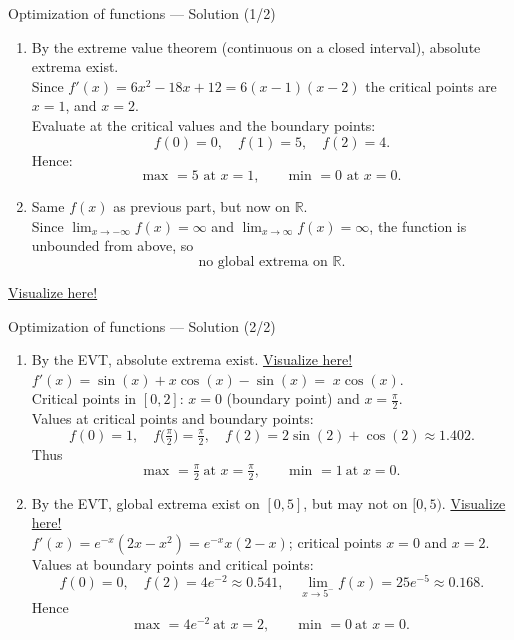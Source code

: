 \documentclass[9pt]{beamer}
\begin{document}
\begin{frame}{Optimization of functions — Solution (1/2)}
\begin{enumerate}[leftmargin=0.5cm, label=(\alph*), rightmargin=0.2cm]

\item By the extreme value theorem (continuous on a closed interval), absolute extrema exist. \\
Since $f'(x)=6x^2-18x+12=6(x-1)(x-2)$ the critical points are $x=1$, and $x=2$. \\
Evaluate at the critical values and the boundary points:
\[
f(0)=0,\quad f(1)=5,\quad f(2)=4.
\]
Hence:
\[
\boxed{\text{max }=5 \text{ at } x=1},\qquad \boxed{\text{min }=0 \text{ at } x=0}.
\]

\item Same $f(x)$ as previous part, but now on $\mathbb{R}$. \\
Since $\lim_{x\to-\infty}f(x)= \infty$ and $\lim_{x\to\infty}f(x)= \infty$, the function is unbounded from above, so
\[
\boxed{\text{no global extrema on }\mathbb{R}}.
\]
\end{enumerate}
\vspace{0.3cm}

\begin{center}
\href{https://www.desmos.com/calculator/3icl7slxkk}{Visualize here!}    
\end{center}

\end{frame}

\begin{frame}{Optimization of functions — Solution (2/2)}
\begin{enumerate}[leftmargin=0.5cm, label=(\alph*), start=3, rightmargin=0.2cm]

\item By the EVT, absolute extrema exist. 
\hfill \href{https://www.desmos.com/calculator/iwqvlmefkv}{Visualize here!} \\
$f'(x)=\sin(x)+x\cos(x)-\sin(x)=\;x\cos(x)$.  \\
Critical points in $[0,2]$: $x=0$ (boundary point) and $x=\tfrac{\pi}{2}$. \\
Values at critical points and boundary points:
\[
f(0)=1,\quad f\!\Big(\tfrac{\pi}{2}\Big)=\tfrac{\pi}{2},\quad
f(2)=2\sin(2)+\cos(2)\approx 1.402.
\]
Thus
\[
\boxed{\text{max }=\tfrac{\pi}{2}\ \text{at }x=\tfrac{\pi}{2}},\qquad
\boxed{\text{min }=1\ \text{at }x=0}.
\]

\item By the EVT, global extrema exist on $[0, 5]$, but may not on $[0, 5)$. 
\hfill \href{https://www.desmos.com/calculator/oh28jgcz3c}{Visualize here!} \\
$f'(x)=e^{-x}(2x-x^2)=e^{-x}x(2-x)$; critical points $x=0$ and $x = 2$. \\
Values at boundary points and critical points:
\[
f(0)=0,\quad f(2)=4e^{-2}\approx 0.541,\quad \lim_{x\to 5^-}f(x)=25e^{-5}\approx 0.168.
\]
Hence
\[
\boxed{\text{max }=4e^{-2}\ \text{at }x=2},\qquad
\boxed{\text{min }=0\ \text{at }x=0}.
\]
\end{enumerate}
\end{frame}
\end{document}
